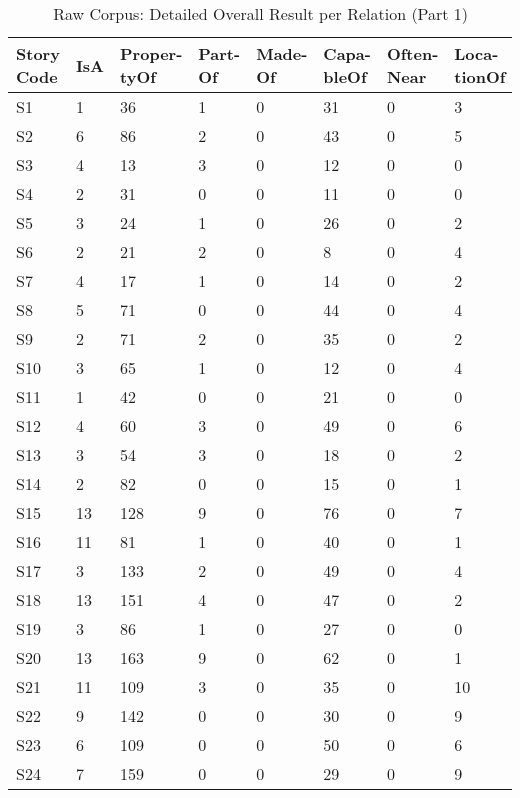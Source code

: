 \begin{table}[H]   %
\centering
\caption{Raw Corpus: Detailed Overall Result per Relation (Part 1)} \vspace{0.25em}
\begin{tabular}{|p{1.5cm}|p{.75cm}|p{1.5cm}|p{1cm}|p{1.25cm}|p{1.25cm}|p{1.5cm}|p{1.5cm}|} \hline
\textbf{Story Code} & \textbf{IsA} & \textbf{Proper-tyOf} & \textbf{Part-Of}  & \textbf{Made-Of} & \textbf{Capa-bleOf} & \textbf{Often-Near} & \textbf{Loca-tionOf} \\ \hline
S1 & 1 & 36 & 1 & 0 & 31 & 0 & 3 \\ \hline
S2 & 6 & 86 & 2 & 0 & 43 & 0 & 5 \\ \hline
S3 & 4 & 13 & 3 & 0 & 12 & 0 & 0 \\ \hline
S4 & 2 & 31 & 0 & 0 & 11 & 0 & 0 \\ \hline
S5 & 3 & 24 & 1 & 0 & 26 & 0 & 2 \\ \hline
S6 & 2 & 21 & 2 & 0 & 8 & 0 & 4 \\ \hline
S7 & 4 & 17 & 1 & 0 & 14 & 0 & 2 \\ \hline
S8 & 5 & 71 & 0 & 0 & 44 & 0 & 4 \\ \hline
S9 & 2 & 71 & 2 & 0 & 35 & 0 & 2 \\ \hline
S10 & 3 & 65 & 1 & 0 & 12 & 0 & 4 \\ \hline
S11 & 1 & 42 & 0 & 0 & 21 & 0 & 0 \\ \hline
S12 & 4 & 60 & 3 & 0 & 49 & 0 & 6 \\ \hline
S13 & 3 & 54 & 3 & 0 & 18 & 0 & 2 \\ \hline
S14 & 2 & 82 & 0 & 0 & 15 & 0 & 1 \\ \hline
S15 & 13 & 128 & 9 & 0 & 76 & 0 & 7 \\ \hline
S16 & 11 & 81 & 1 & 0 & 40 & 0 & 1 \\ \hline
S17 & 3 & 133 & 2 & 0 & 49 & 0 & 4 \\ \hline
S18 & 13 & 151 & 4 & 0 & 47 & 0 & 2 \\ \hline
S19 & 3 & 86 & 1 & 0 & 27 & 0 & 0 \\ \hline
S20 & 13 & 163 & 9 & 0 & 62 & 0 & 1 \\ \hline
S21 & 11 & 109 & 3 & 0 & 35 & 0 & 10 \\ \hline
S22 & 9 & 142 & 0 & 0 & 30 & 0 & 9 \\ \hline
S23 & 6 & 109 & 0 & 0 & 50 & 0 & 6 \\ \hline
S24 & 7 & 159 & 0 & 0 & 29 & 0 & 9 \\ \hline

\end{tabular}
\end{table}
